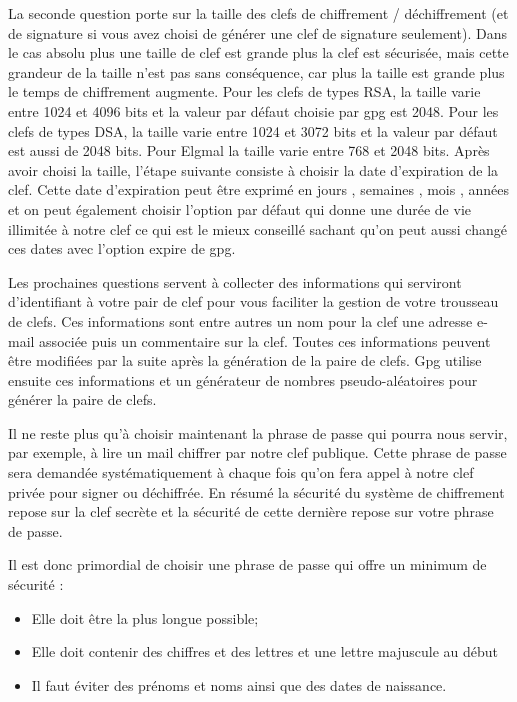 \medbreak

La seconde question porte sur la taille des clefs de chiffrement / déchiffrement (et de signature si vous avez choisi de générer une 
clef de signature seulement).
Dans le cas absolu plus une taille de clef est grande plus la clef est sécurisée, mais cette grandeur de la taille n'est pas sans
conséquence, car plus la taille est grande plus le temps de chiffrement augmente.
Pour les clefs de types RSA, la taille varie entre 1024 et 4096 bits et la valeur par défaut choisie par gpg est 2048.
Pour les clefs de types DSA, la taille varie entre 1024 et 3072 bits et la valeur par défaut est aussi de 2048 bits.
Pour Elgmal la taille varie entre 768 et 2048 bits.
Après avoir choisi la taille, l'étape suivante consiste à choisir la date d'expiration de la clef.
Cette date d'expiration peut être exprimé en jours , semaines , mois , années et on peut également choisir l'option par défaut qui 
donne une durée de vie illimitée à notre clef ce qui est le mieux conseillé sachant qu'on peut aussi changé ces  dates avec l'option 
expire de gpg.

Les prochaines questions servent à collecter des informations qui serviront d'identifiant à votre pair de clef pour vous faciliter la
gestion de votre trousseau de clefs. Ces informations sont entre autres un nom pour la clef une adresse e-mail associée puis un commentaire 
sur la clef. Toutes ces informations peuvent être modifiées par la suite après la génération de la paire de clefs.
Gpg utilise ensuite ces informations et un générateur de nombres pseudo-aléatoires pour générer la paire de clefs.

Il ne reste plus qu'à choisir maintenant la phrase de passe qui pourra nous servir, par exemple, à lire un mail chiffrer par notre clef publique. Cette phrase de passe sera demandée systématiquement à chaque fois qu'on fera appel à notre clef privée pour
signer ou déchiffrée.
En résumé la sécurité du système de chiffrement repose sur la clef secrète et la sécurité de cette dernière repose sur votre 
phrase de passe.

\newpage

Il est donc primordial de choisir une phrase de passe qui offre un minimum de sécurité :
\begin{itemize}
\item Elle doit être la plus longue possible;
\item Elle doit contenir des chiffres et des lettres et une lettre majuscule au début
\item Il faut éviter des prénoms et noms ainsi que des dates de naissance. 
\end{itemize}
 
